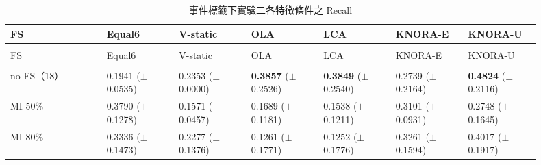 \begingroup
\small{}\setlength{\tabcolsep}{3pt}
\setlength{\LTleft}{\fill}\setlength{\LTright}{\fill}
\begin{longtable}{@{}>{\raggedright\arraybackslash}p{0.16\linewidth}>{\raggedright\arraybackslash}p{0.123\linewidth}>{\raggedright\arraybackslash}p{0.123\linewidth}>{\raggedright\arraybackslash}p{0.123\linewidth}>{\raggedright\arraybackslash}p{0.123\linewidth}>{\raggedright\arraybackslash}p{0.123\linewidth}>{\raggedright\arraybackslash}p{0.123\linewidth}@{}}
\caption{事件標籤下實驗二各特徵條件之 Recall}\label{tab:results-fs-recall}\\
\toprule
FS & Equal6 & V-static & OLA & LCA & KNORA-E & KNORA-U \\
\midrule\endfirsthead
\multicolumn{7}{c}{表~\thetable（續）}\\
\toprule
FS & Equal6 & V-static & OLA & LCA & KNORA-E & KNORA-U \\
\midrule\endhead
\midrule\multicolumn{7}{r}{續下頁}\\\endfoot
\bottomrule\endlastfoot
no-FS（18） & \shortstack[l]{0.1941\\{\scriptsize(\(\pm\)0.0535)}} & \shortstack[l]{0.2353\\{\scriptsize(\(\pm\)0.0000)}} & \shortstack[l]{\textbf{0.3857}\\{\scriptsize(\(\pm\)0.2526)}} & \shortstack[l]{\textbf{0.3849}\\{\scriptsize(\(\pm\)0.2540)}} & \shortstack[l]{0.2739\\{\scriptsize(\(\pm\)0.2164)}} & \shortstack[l]{\textbf{0.4824}\\{\scriptsize(\(\pm\)0.2116)}} \\
MI 50\% & \shortstack[l]{0.3790\\{\scriptsize(\(\pm\)0.1278)}} & \shortstack[l]{0.1571\\{\scriptsize(\(\pm\)0.0457)}} & \shortstack[l]{0.1689\\{\scriptsize(\(\pm\)0.1181)}} & \shortstack[l]{0.1538\\{\scriptsize(\(\pm\)0.1211)}} & \shortstack[l]{0.3101\\{\scriptsize(\(\pm\)0.0931)}} & \shortstack[l]{0.2748\\{\scriptsize(\(\pm\)0.1645)}} \\
MI 80\% & \shortstack[l]{0.3336\\{\scriptsize(\(\pm\)0.1473)}} & \shortstack[l]{0.2277\\{\scriptsize(\(\pm\)0.1376)}} & \shortstack[l]{0.1261\\{\scriptsize(\(\pm\)0.1771)}} & \shortstack[l]{0.1252\\{\scriptsize(\(\pm\)0.1776)}} & \shortstack[l]{0.3261\\{\scriptsize(\(\pm\)0.1594)}} & \shortstack[l]{0.4017\\{\scriptsize(\(\pm\)0.1917)}} \\

\end{longtable}
